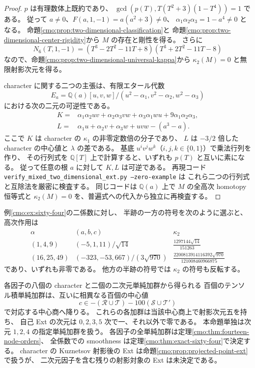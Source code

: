 \begin{proof}
$p$ は有理数体上既約であり、
$\gcd(p(T),T(T^2+3)(1-T^4))=1$ である。
従って $a\ne0$、$F(a,1,-1)=a(a^2+3)\ne0$、
$\alpha_1\alpha_2\alpha_3=1-a^4\ne0$ となる。
命題\ref{cmo:prop:two-dimensional-classification}と
命題\ref{cmo:prop:two-dimensional-center-rigidity}から $M$ の存在と剛性を得る。
さらに
\[
 N_6(T,1,-1)
 =(T^3-2T^2-11T+8)(T^3+2T^2-11T-8)
\]
なので、命題\ref{cmo:prop:two-dimensional-universal-kappa}から
$\kappa_2(M)=0$ と無限射影次元を得る。

character に関する二つの主張は、有限エタール代数
\[
 E_a=\mathbb Q(a)[u,v,w]/
 (u^2-\alpha_1,v^2-\alpha_2,w^2-\alpha_3)
\]
における次の二元の可逆性である。
\[
 \begin{split}
 K={}&\alpha_1\alpha_2uv+\alpha_2\alpha_3vw
        +\alpha_3\alpha_1wu+9\alpha_1\alpha_2\alpha_3,\\
 L={}&\alpha_1u+\alpha_2v+\alpha_3w+uvw-(a^3-a).
 \end{split}
\]
ここで $K$ は character の $\kappa_1$ の非零定数倍の分子であり、
$L$ は $-3/2$ 倍した character の中心値と $\lambda$ の差である。
基底 $u^iv^jw^k$（$i,j,k\in\{0,1\}$）で乗法行列を作り、
その行列式を $\mathbb Q[T]$ 上で計算すると、いずれも $p(T)$ と互いに素になる。
従って任意の根 $a$ に対して $K,L$ は可逆である。
再現コード \texttt{verify\_mixed\_two\_dimensional\_ext.py --zero-example} は
これら二つの行列式と互除法を厳密に検査する。
同じコードは $\mathbb Q(a)$ 上で $M$ の全高次 homotopy 恒等式と
$\kappa_2(M)=0$ を、普遍式への代入から独立に再検査する。
\end{proof}

\begin{proposition}[指定二係数の二次元高次作用と百個の単純加群]
\label{cmo:prop:one-two-dimensional-pd}
例\ref{cmo:ex:sixty-four}の二係数に対し、
半跡の一方の符号を次のように選ぶと、高次作用は
\begin{equation}\label{cmo:eq:two-dimensional-exact-kappa}
 \begin{array}{c|c|c}
 \alpha&(a,b,c)&\kappa_2\\\hline
 (1,4,9)&(-5,1,11)/\sqrt{14}&
 \displaystyle\frac{1297144\sqrt{14}}{151263}\\[3pt]
 (16,25,49)&(-323,-53,667)/(3\sqrt{970})&
 \displaystyle\frac{2200813914116392\sqrt{970}}{121008460966875}
 \end{array}
\end{equation}
であり、いずれも非零である。
他方の半跡の符号では $\kappa_2$ の符号も反転する。

各因子の八個の character と二個の二次元単純加群から得られる
百個のテンソル積単純加群は、互いに相異なる百個の中心値
\[
 c\in-(\mathcal R\cup\mathcal T)-100(\mathcal S\cup\mathcal T')
\]
で対応する中心商へ降りる。
これらの各加群は当該中心商上で射影次元五を持ち、
自己 Ext の次元は $0,2,3,5$ 次で一、それ以外で零である。
本命題単独は次元 $1,2,4$ の指定単純加群を扱う。
各因子の全単純加群は定理\ref{cmo:thm:fourteen-node-orders}、
全係数での smoothness は定理\ref{cmo:thm:exact-sixty-four}で決定する。
character の Kuznetsov 射影後の Ext は命題\ref{cmo:prop:projected-point-ext}で扱うが、
二次元因子を含む残りの射影対象の Ext は未決定である。
\end{proposition}

